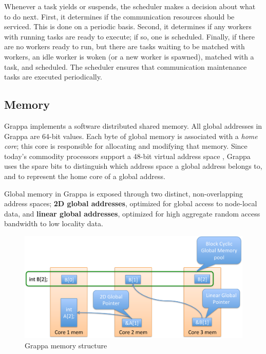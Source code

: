 Whenever a task yields or suspends, the scheduler makes a decision about
what to do next. First, it determines if the communication resources
should be serviced. This is done on a periodic basis. Second, it
determines if any workers with running tasks are ready to execute; if
so, one is scheduled. Finally, if there are no workers ready to run, but
there are tasks waiting to be matched with workers, an idle worker is
woken (or a new worker is spawned), matched with a task, and scheduled.
The scheduler ensures that communication maintenance tasks are executed periodically.

\subsection{Memory}


Grappa implements a software distributed shared memory. All global
addresses in Grappa are 64-bit values. Each byte of global memory is
associated with a {\em home core}; this core is responsible for
allocating and modifying that memory. Since today's commodity processors
support a 48-bit virtual address space \cite{AMD64}, Grappa uses the
spare bits to distinguish which address space a global address belongs
to, and to represent the home core of a global address.

Global memory in Grappa is exposed through two distinct, non-overlapping
address spaces; \textbf{2D global addresses}, optimized for global
access to node-local data, and \textbf{linear global addresses},
optimized for high aggregate random access bandwidth to low locality
data.



\begin{figure}[t]
\begin{center}
  \includegraphics[width=0.95\columnwidth]{figs/memory-structure}
\begin{minipage}{0.95\columnwidth}
  \caption{\label{fig:memory-structure} Grappa memory structure}
\end{minipage}
\vspace{-3ex}
\end{center}
\end{figure}


